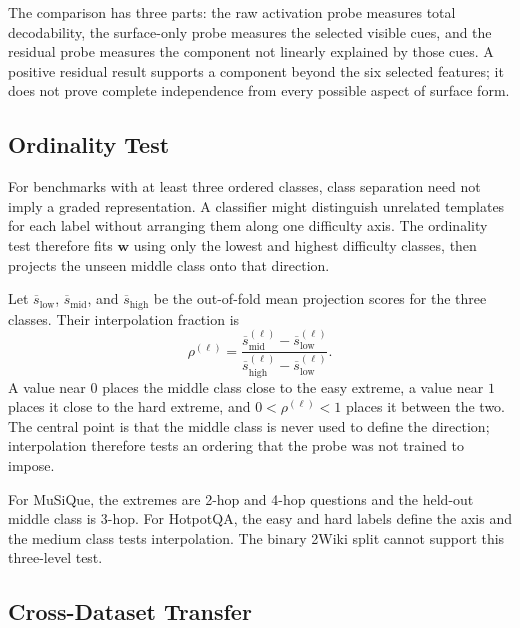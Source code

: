 The comparison has three parts: the raw activation probe measures total
decodability, the surface-only probe measures the selected visible cues, and the
residual probe measures the component not linearly explained by those cues. A
positive residual result supports a component beyond the six selected features;
it does not prove complete independence from every possible aspect of surface
form.

\subsection{Ordinality Test}
\label{subsec:ordinality-test}

For benchmarks with at least three ordered classes, class separation need not
imply a graded representation. A classifier might distinguish unrelated
templates for each label without arranging them along one difficulty axis. The
ordinality test therefore fits \(\mathbf{w}\) using only the lowest and highest
difficulty classes, then projects the unseen middle class onto that direction.

Let \(\overline{s}_{\mathrm{low}}\),
\(\overline{s}_{\mathrm{mid}}\), and
\(\overline{s}_{\mathrm{high}}\) be the out-of-fold mean projection scores for
the three classes. Their interpolation fraction is
\begin{equation}
  \rho^{(\ell)}=
  \frac{\overline{s}_{\mathrm{mid}}^{(\ell)}
        -\overline{s}_{\mathrm{low}}^{(\ell)}}
       {\overline{s}_{\mathrm{high}}^{(\ell)}
        -\overline{s}_{\mathrm{low}}^{(\ell)}}.
  \label{eq:ordinality-fraction}
\end{equation}
A value near \(0\) places the middle class close to the easy extreme, a value
near \(1\) places it close to the hard extreme, and
\(0<\rho^{(\ell)}<1\) places it between the two. The central point is that the
middle class is never used to define the direction; interpolation therefore
tests an ordering that the probe was not trained to impose.

For MuSiQue, the extremes are 2-hop and 4-hop questions and the held-out middle
class is 3-hop. For HotpotQA, the easy and hard labels define the axis and the
medium class tests interpolation. The binary 2Wiki split cannot support this
three-level test.

\subsection{Cross-Dataset Transfer}
\label{subsec:cross-dataset-transfer}

